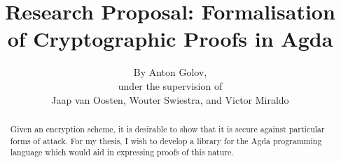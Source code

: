 \documentclass{report}
\title{Research Proposal: Formalisation of Cryptographic Proofs in Agda}
\author{By Anton Golov,\\under the supervision of\\Jaap van Oosten, Wouter Swiestra, and Victor Miraldo}
\begin{document}
    \maketitle

    \begin{abstract}
        Given an encryption scheme, it is desirable to show that it is secure against particular forms of attack.  For
        my thesis, I wish to develop a library for the Agda programming language which would aid in expressing proofs of
        this nature.
    \end{abstract}
    \tableofcontents

    
    
    
    
    

    
    
\end{document}
